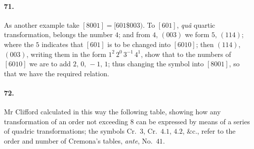 \documentclass[11pt]{article}
\begin{document}
\medskip

\paragraph{71.}
As another example take $[8001]=[601\$003)$. To $[601]$, \textit{qu\^a}
quartic transformation, belongs the number $4$; and from $4$, $(003)$ we
form $5$, $(114)$; where the $5$ indicates that $[601]$ is to be changed
into $[6010]$; then $(114)$, $(003)$, writing them in the form
$1^{2}\,2^{0}\,3^{-1}\,4^{1}$, show that to the numbers of $[6010]$ we
are to add $2,\,0,\,-1,\,1$; thus changing the symbol into $[8001]$, so
that we have the required relation.

\medskip

\paragraph{72.}
Mr Clifford calculated in this way the following table, showing how any
transformation of an order not exceeding $8$ can be expressed by means of
a series of quadric transformations; the symbols Cr.~$3$, Cr.~$4.1$,
$4.2$, \&c., refer to the order and number of Cremona's tables,
\textit{ante}, No.~$41$.

\medskip
\end{document}
